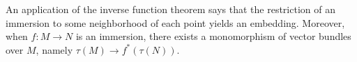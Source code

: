 An application of the inverse function theorem says that the restriction of an immersion to some neighborhood of each point yields an embedding. Moreover, when $f: M \rightarrow N$ is an immersion, there exists a monomorphism of vector bundles over $M$, namely $\tau(M) \rightarrow f^*(\tau(N))$.
